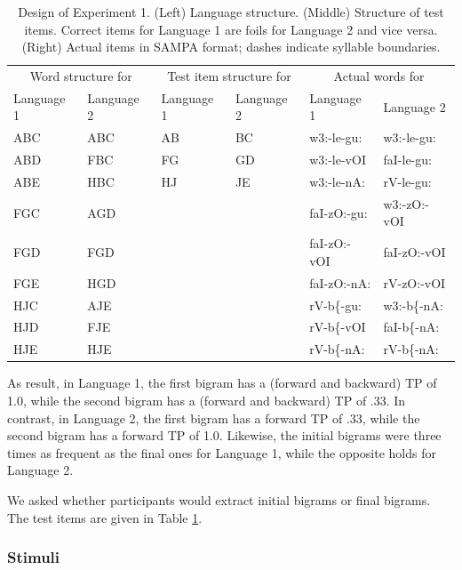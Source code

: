 \documentclass[
]{article}
\begin{document}
\begin{table}

\caption{\label{tab:stats-london-print-language-structure}Design of Experiment 1. (Left) Language structure. (Middle) Structure of test items. Correct items for Language 1 are foils for Language 2 and vice versa. (Right) Actual items in SAMPA format; dashes indicate syllable boundaries.}
\centering
\begin{tabular}[t]{llllll}
\toprule
\multicolumn{2}{c}{Word structure for} & \multicolumn{2}{c}{Test item structure for} & \multicolumn{2}{c}{Actual words for} \\
Language 1 & Language 2 & Language 1 & Language 2 & Language 1 & Language 2\\
\midrule
ABC & ABC & AB & BC & w3:-le-gu: & w3:-le-gu:\\
ABD & FBC & FG & GD & w3:-le-vOI & faI-le-gu:\\
ABE & HBC & HJ & JE & w3:-le-nA: & rV-le-gu:\\
FGC & AGD &  &  & faI-zO:-gu: & w3:-zO:-vOI\\
FGD & FGD &  &  & faI-zO:-vOI & faI-zO:-vOI\\
\addlinespace
FGE & HGD &  &  & faI-zO:-nA: & rV-zO:-vOI\\
HJC & AJE &  &  & rV-b\{-gu: & w3:-b\{-nA:\\
HJD & FJE &  &  & rV-b\{-vOI & faI-b\{-nA:\\
HJE & HJE &  &  & rV-b\{-nA: & rV-b\{-nA:\\
\bottomrule
\end{tabular}
\end{table}

As result, in Language 1, the first bigram has a (forward and backward)
TP of 1.0, while the second bigram has a (forward and backward) TP of
.33. In contrast, in Language 2, the first bigram has a forward TP of
.33, while the second bigram has a forward TP of 1.0. Likewise, the
initial bigrams were three times as frequent as the final ones for
Language 1, while the opposite holds for Language 2.

We asked whether participants would extract initial bigrams or final
bigrams. The test items are given in Table
\ref{tab:stats-london-print-language-structure}.

\hypertarget{stimuli}{%
\subsubsection{Stimuli}\label{stimuli}}
\end{document}
